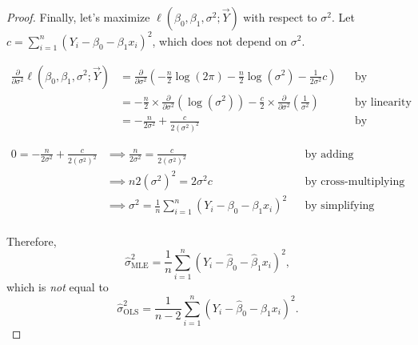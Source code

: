 \documentclass[12pt,oneside]{article}
\newcommand{\MLE}{\text{MLE}}
\newcommand{\OLS}{\text{OLS}}
\theoremstyle{definition}
\theoremstyle{remark}
\begin{document}
\begin{proof}
Finally, let's maximize $\ell(\beta_0, \beta_1, \sigma^2; \vec{Y})$ with respect to $\sigma^2$. Let $c = \sum_{i = 1}^{n} (Y_i - \beta_0 - \beta_1 x_i)^2$, which does not depend on $\sigma^2$.

\[
\begin{aligned}
\frac{\partial}{\partial \sigma^2} \ell(\beta_0, \beta_1, \sigma^2; \vec{Y}) &= \frac{\partial}{\partial \sigma^2} \left( - \frac{n}{2}\log(2\pi) - \frac{n}{2}\log(\sigma^2) - \frac{1}{2\sigma^2} c \right) && \text{by substituting} \\
&= - \frac{n}{2} \times \frac{\partial}{\partial \sigma^2} \left( \log(\sigma^2) \right) - \frac{c}{2} \times \frac{\partial}{\partial \sigma^2} \left( \frac{1}{\sigma^2} \right) && \text{by linearity} \\
&= - \frac{n}{2 \sigma^2} + \frac{c}{2 (\sigma^2)^2} && \text{by simplifying}
\end{aligned}
\]

\[
\begin{aligned}
0 = - \frac{n}{2 \sigma^2} + \frac{c}{2 (\sigma^2)^2} &\implies \frac{n}{2 \sigma^2} = \frac{c}{2 (\sigma^2)^2} && \text{by adding} \\
&\implies n 2 (\sigma^2)^2 = 2 \sigma^2 c && \text{by cross-multiplying} \\
&\implies \sigma^2 = \frac{1}{n} \sum_{i = 1}^{n} (Y_i - \beta_0 - \beta_1 x_i)^2 && \text{by simplifying} \\
\end{aligned}
\]

Therefore, \[\hat{\sigma}^2_{\MLE} = \frac{1}{n} \sum_{i = 1}^{n} (Y_i - \hat{\beta}_0 - \hat{\beta}_1 x_i)^2,\] which is \textit{not} equal to \[\hat{\sigma}^2_{\OLS} = \frac{1}{n - 2} \sum_{i = 1}^{n} (Y_i - \hat{\beta}_0 - \hat{\beta}_1 x_i)^2.\]
\end{proof}
\end{document}
